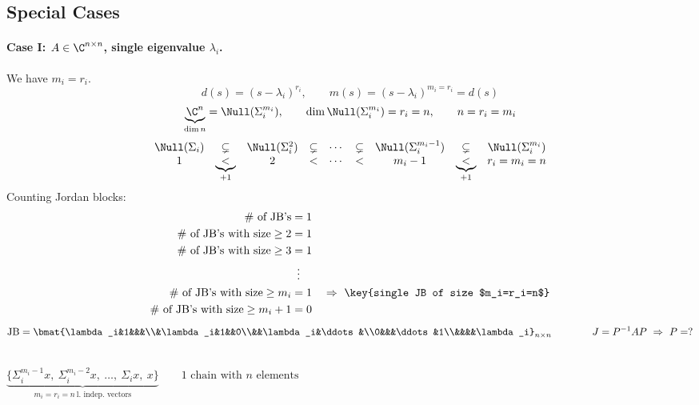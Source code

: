 \subsection{Special Cases}\label{ss:jordan-special}

\paragraph{Case I: $A\in\C^{n\times n}$, single eigenvalue $\lambda_i$.}
We have $m_i=r_i$.
\[
d(s)=(s-\lambda_i)^{r_i},\qquad m(s)=(s-\lambda_i)^{m_i=r_i}=d(s)
\]
\[
\underbrace{\C^n}_{\dim n}=\Null(\Sigma_i^{m_i}),\qquad \dim\Null(\Sigma_i^{m_i})=r_i=n,\qquad n=r_i=m_i
\]
\[
\begin{array}{ccccccccc}
\Null(\Sigma_i) &\subsetneq& \Null(\Sigma_i^2) &\subsetneq& \cdots &\subsetneq& \Null(\Sigma_i^{m_i-1}) &\subsetneq& \Null(\Sigma_i^{m_i})\\
1 &\underbrace{<}_{+1}& 2 &<& \cdots &<& m_i-1 &\underbrace{<}_{+1}& r_i=m_i=n
\end{array}
\]
Counting Jordan blocks:
\begin{align*}
\#\text{ of JB's}&=1\\
\#\text{ of JB's with size}\geq 2&=1\\
\#\text{ of JB's with size}\geq 3&=1\\
&\ \,\vdots\\
\#\text{ of JB's with size}\geq m_i&=1\quad\Rightarrow\ \text{\key{single JB of size $m_i=r_i=n$}}\\
\#\text{ of JB's with size}\geq m_i+1&=0
\end{align*}
\[
\text{JB}=\bmat{\lambda_i&1&&&\\&\lambda_i&1&&0\\&&\lambda_i&\ddots&\\0&&&\ddots&1\\&&&&\lambda_i}_{n\times n}
\qquad\qquad J=P^{-1}AP\ \Rightarrow\ P=?
\]
\begin{center}
\\[6pt]
$\displaystyle\underbrace{\{\Sigma_i^{m_i-1}x,\ \Sigma_i^{m_i-2}x,\ \dots,\ \Sigma_i x,\ x\}}_{m_i=r_i=n\ \text{l.\ indep.\ vectors}}
\qquad \text{1 chain with $n$ elements}$
\end{center}
